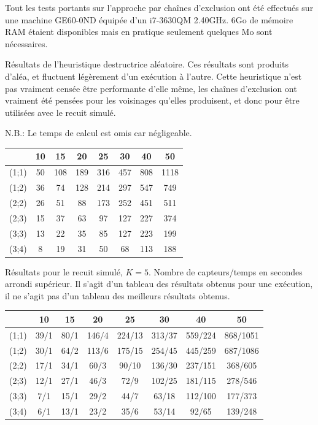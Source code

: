 \documentclass[12pt,a4paper]{article}
\begin{document}
Tout les tests portants sur l'approche par chaînes d'exclusion ont été effectués sur une machine GE60-0ND équipée d'un i7-3630QM 2.40GHz. 6Go de mémoire RAM étaient disponibles mais en pratique seulement quelques Mo sont nécessaires.

Résultats de l'heuristique destructrice aléatoire. Ces résultats sont produits d'aléa, et fluctuent légèrement d'un exécution à l'autre. Cette heuristique n'est pas vraiment censée être performante d'elle même, les chaînes d'exclusion ont vraiment été pensées pour les voisinages qu'elles produisent, et donc pour être utilisées avec le recuit simulé. 

N.B.: Le temps de calcul est omis car négligeable.
\begin{center}
\begin{tabular}{|c|c|c|c|c|c|c|c|}
\hline
&10 & 15 & 20 & 25 & 30 & 40 & 50\\
\hline 
(1;1) & 50 & 108 & 189 & 316 & 457 & 808 & 1118 \\ 
\hline 
(1;2) & 36 & 74 & 128 & 214 & 297 & 547 & 749 \\ 
\hline 
(2;2) & 26 & 51 & 88 & 173 & 252 & 451 & 511 \\ 
\hline 
(2;3) & 15 & 37 & 63 & 97 & 127 & 227 & 374 \\ 
\hline 
(3;3) & 13 & 22 & 35 & 85 & 127 & 223 & 199 \\ 
\hline 
(3;4) & 8 & 19 & 31 & 50 & 68 & 113 & 188 \\ 
\hline 
\end{tabular} 
\end{center}

Résultats pour le recuit simulé, $K=5$. 
Nombre de capteurs/temps en secondes arrondi supérieur. Il s'agit d'un tableau des résultats obtenus pour une exécution, il ne s'agit pas d'un tableau des meilleurs résultats obtenus.

\begin{center}
\begin{tabular}{|c|c|c|c|c|c|c|c|}
\hline
&10 & 15 & 20 & 25 & 30 & 40 & 50\\
\hline 
(1;1) & 39/1 & 80/1 & 146/4 & 224/13 & 313/37 & 559/224 & 868/1051 \\ 
\hline 
(1;2) & 30/1 & 64/2 & 113/6 & 175/15 & 254/45 & 445/259 & 687/1086 \\ 
\hline 
(2;2) & 17/1 & 34/1 & 60/3 & 90/10 & 136/30 & 237/151 & 368/605 \\ 
\hline 
(2;3) & 12/1 & 27/1 & 46/3& 72/9 & 102/25 & 181/115 & 278/546 \\ 
\hline 
(3;3) & 7/1 & 15/1 & 29/2 & 44/7 & 63/18 & 112/100 & 177/373 \\ 
\hline 
(3;4) & 6/1 & 13/1 & 23/2 & 35/6 & 53/14 & 92/65 & 139/248 \\ 
\hline 
\end{tabular} 
\end{center}
\end{document}
